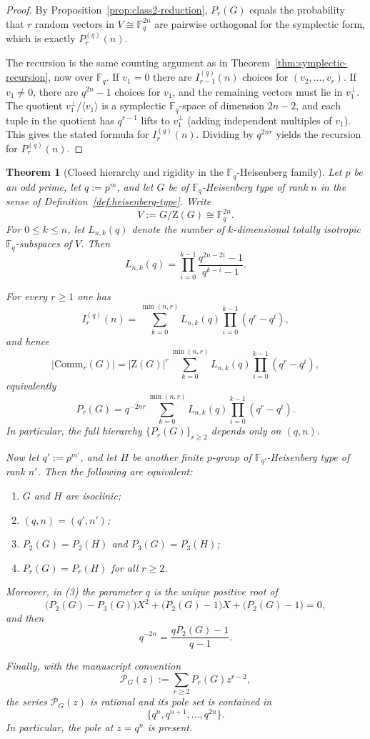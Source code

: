 \documentclass[11pt]{article}
\newtheorem{theorem}{Theorem}[section]
\theoremstyle{definition}
\theoremstyle{remark}
\theoremstyle{definition}
\theoremstyle{plain}
\newcommand{\Z}{\mathrm{Z}}
\newcommand{\Comm}{\mathrm{Comm}}
\begin{document}
\begin{proof}
By Proposition~\ref{prop:class2-reduction}, $P_r(G)$ equals the probability that $r$ random vectors in $V\cong\mathbb F_q^{2n}$
are pairwise orthogonal for the symplectic form, which is exactly $P_r^{(q)}(n)$.

The recursion is the same counting argument as in Theorem~\ref{thm:symplectic-recursion}, now over $\mathbb F_q$.
If $v_1=0$ there are $I_{r-1}^{(q)}(n)$ choices for $(v_2,\dots,v_r)$.
If $v_1\neq 0$, there are $q^{2n}-1$ choices for $v_1$, and the remaining vectors must lie in $v_1^\perp$.
The quotient $v_1^\perp/\langle v_1\rangle$ is a symplectic $\mathbb F_q$-space of dimension $2n-2$,
and each tuple in the quotient has $q^{r-1}$ lifts to $v_1^\perp$ (adding independent multiples of $v_1$).
This gives the stated formula for $I_r^{(q)}(n)$.
Dividing by $q^{2nr}$ yields the recursion for $P_r^{(q)}(n)$.
\end{proof}

\begin{theorem}[Closed hierarchy and rigidity in the $\mathbb F_q$-Heisenberg family]\label{thm:heisenberg-full-hierarchy}\label{thm:rank2-heisenberg-isoclinism}
Let $p$ be an odd prime, let $q:=p^m$, and let $G$ be of $\mathbb F_q$-Heisenberg type of rank $n$
in the sense of Definition~\ref{def:heisenberg-type}. Write
\[
V:=G/\Z(G)\cong \mathbb F_q^{2n}.
\]
For $0\le k\le n$, let $L_{n,k}(q)$ denote the number of $k$-dimensional totally isotropic
$\mathbb F_q$-subspaces of $V$. Then
\[
L_{n,k}(q)=\prod_{i=0}^{k-1}\frac{q^{2n-2i}-1}{q^{k-i}-1}.
\]

For every $r\ge 1$ one has
\[
I_r^{(q)}(n)
=
\sum_{k=0}^{\min(n,r)}
L_{n,k}(q)\prod_{i=0}^{k-1}(q^r-q^i),
\]
and hence
\[
|\Comm_r(G)|
=
|\Z(G)|^r
\sum_{k=0}^{\min(n,r)}
L_{n,k}(q)\prod_{i=0}^{k-1}(q^r-q^i),
\]
equivalently
\[
P_r(G)
=
q^{-2nr}
\sum_{k=0}^{\min(n,r)}
L_{n,k}(q)\prod_{i=0}^{k-1}(q^r-q^i).
\]
In particular, the full hierarchy $\{P_r(G)\}_{r\ge2}$ depends only on $(q,n)$.

Now let $q':=p^{m'}$, and let $H$ be another finite $p$-group of $\mathbb F_{q'}$-Heisenberg type of rank $n'$.
Then the following are equivalent:
\begin{enumerate}
\item $G$ and $H$ are isoclinic;
\item $(q,n)=(q',n')$;
\item $P_2(G)=P_2(H)$ and $P_3(G)=P_3(H)$;
\item $P_r(G)=P_r(H)$ for all $r\ge2$.
\end{enumerate}
Moreover, in (3) the parameter $q$ is the unique positive root of
\[
\bigl(P_2(G)-P_3(G)\bigr)X^2+\bigl(P_2(G)-1\bigr)X+\bigl(P_2(G)-1\bigr)=0,
\]
and then
\[
q^{-2n}=\frac{qP_2(G)-1}{q-1}.
\]

Finally, with the manuscript convention
\[
\mathcal P_G(z):=\sum_{r\ge2}P_r(G)z^{r-2},
\]
the series $\mathcal P_G(z)$ is rational and its pole set is contained in
\[
\{q^n,q^{n+1},\dots,q^{2n}\}.
\]
In particular, the pole at $z=q^n$ is present.
\end{theorem}
\end{document}
